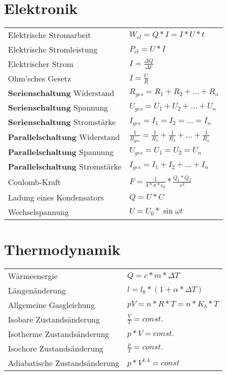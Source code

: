 \documentclass[12pt,a4paper]{paper}
\begin{document}
\section{Elektronik}
\begin{tabularx}{\textwidth}{X|X}
	Elektrische Stromarbeit & $ W_{el} = Q * I = I * U * t$\\
	Elektrische Stromleistung & $P_{el} = U * I$\\
	Elektrischer Strom & $I = \frac{\Delta Q}{\Delta t}$\\
	Ohm'sches Gesetz & $I=\frac{U}{R}$\\
	\textbf{Serienschaltung} Widerstand & $R_{ges} = R_1 + R_2 + \dots + R_n$\\
	\textbf{Serienschaltung} Spannung & $U_{ges} = U_1 + U_2 + \dots + U_n$\\
	\textbf{Serienschaltung} Stromstärke & $ I_{ges} = I_1 = I_2 = \dots  = I_n$\\

	\textbf{Parallelschaltung} Widerstand & $\frac{1}{R_{ges}} = \frac{1}{R_{1}} + \frac{1}{R_{2}} + \dots + \frac{1}{R_{n}}$\\
	\textbf{Parallelschaltung} Spannung & $U_{ges} = U_{1} = U_{2} = U_{n}$\\
	\textbf{Parallelschaltung} Stromstärke  & $I_{ges}=I_{1}+I_{2}+\dots+I_{n}$\\
	Coulomb-Kraft & $F = \frac{1}{4*\pi * \epsilon_{0}} * \frac{Q_1 * Q_2}{r^2}$\\
	Ladung eines Kondensators & $Q = U * C$\\
	Wechselspannung & $U = U_0 * \sin{\omega t}$\\
\end{tabularx}
\section{Thermodynamik}
\begin{tabularx}{\textwidth}{X|X}
	Wärmeenergie & $Q=c*m*\Delta T$\\
	Längenänderung & $l = l_0 * (1 + \alpha * \Delta T)$\\
	Allgemeine Gasgleichung & $pV = n*R*T = n *K_b * T$\\
	Isobare Zustandsänderung & $\frac{V}{T} = const.$\\
	Isotherme Zustandsänderung & $p*V = const.$\\
	Isochore Zustandsänderung & $\frac{p}{T} = const.$\\
	Adiabatische Zustandsänderung & $p * V^{1.4} = const$
\end{tabularx}
\end{document}
